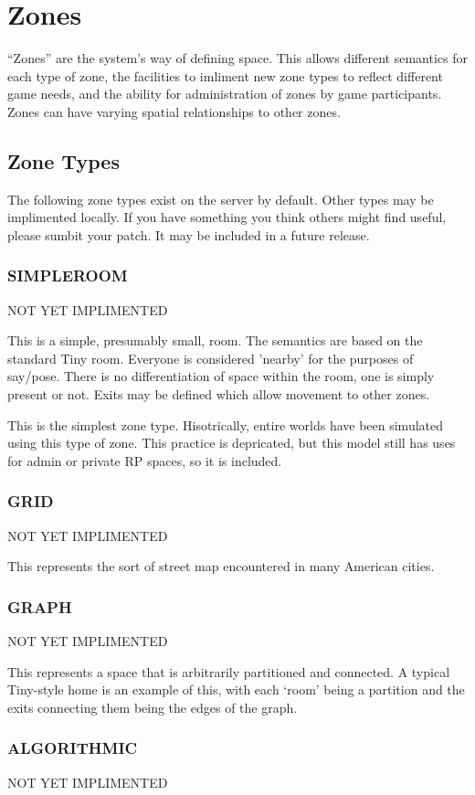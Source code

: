\documentclass[10pt,letterpaper,twoside]{book}
\begin{document}
\chapter{Zones}
``Zones'' are the system's way of defining space.
This allows different semantics for each type of zone, the facilities to imliment new zone types to reflect different game needs, and the ability for administration of zones by game participants.
Zones can have varying spatial relationships to other zones.
\section{Zone Types}
The following zone types exist on the server by default.
Other types may be implimented locally.
If you have something you think others might find useful, please sumbit your patch.
It may be included in a future release.
\subsection{SIMPLEROOM}
NOT YET IMPLIMENTED

This is a simple, presumably small, room.
The semantics are based on the standard Tiny room.
Everyone is considered 'nearby' for the purposes of say/pose.
There is no differentiation of space within the room, one is simply present or not.
Exits may be defined which allow movement to other zones.

This is the simplest zone type.
Hisotrically, entire worlds have been simulated using this type of zone.
This practice is depricated, but this model still has uses for admin or private RP spaces, so it is included.
\subsection{GRID}
NOT YET IMPLIMENTED

This represents the sort of street map encountered in many American cities.
\subsection{GRAPH}
NOT YET IMPLIMENTED

This represents a space that is arbitrarily partitioned and connected.
A typical Tiny-style home is an example of this, with each `room' being a partition and the exits connecting them being the edges of the graph.
\subsection{ALGORITHMIC}
NOT YET IMPLIMENTED
\end{document}
